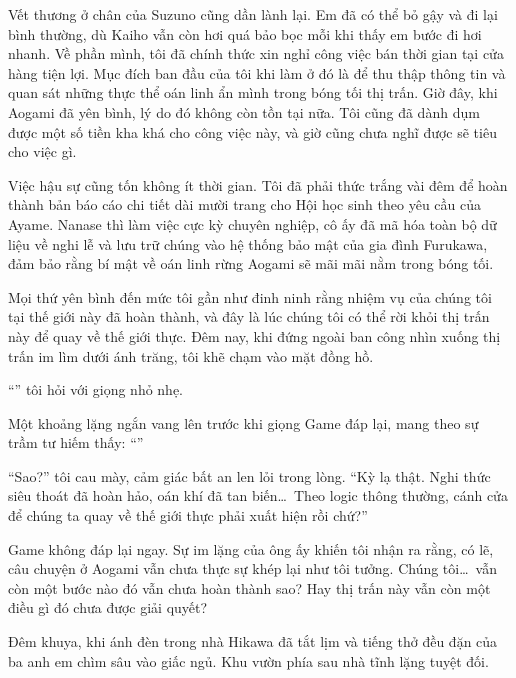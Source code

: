 \documentclass[../main.tex]{subfiles}
\begin{document}
Vết thương ở chân của Suzuno cũng dần lành lại. Em đã có thể bỏ gậy và đi lại bình thường, dù Kaiho vẫn còn hơi quá bảo bọc mỗi khi thấy em bước đi hơi nhanh. Về phần mình, tôi đã chính thức xin nghỉ công việc bán thời gian tại cửa hàng tiện lợi. Mục đích ban đầu của tôi khi làm ở đó là để thu thập thông tin và quan sát những thực thể oán linh ẩn mình trong bóng tối thị trấn. Giờ đây, khi Aogami đã yên bình, lý do đó không còn tồn tại nữa. Tôi cũng đã dành dụm được một số tiền kha khá cho công việc này, và giờ cũng chưa nghĩ được sẽ tiêu cho việc gì.

Việc hậu sự cũng tốn không ít thời gian. Tôi đã phải thức trắng vài đêm để hoàn thành bản báo cáo chi tiết dài mười trang cho Hội học sinh theo yêu cầu của Ayame. Nanase thì làm việc cực kỳ chuyên nghiệp, cô ấy đã mã hóa toàn bộ dữ liệu về nghi lễ và lưu trữ chúng vào hệ thống bảo mật của gia đình Furukawa, đảm bảo rằng bí mật về oán linh rừng Aogami sẽ mãi mãi nằm trong bóng tối.

Mọi thứ yên bình đến mức tôi gần như đinh ninh rằng nhiệm vụ của chúng tôi tại thế giới này đã hoàn thành, và đây là lúc chúng tôi có thể rời khỏi thị trấn này để quay về thế giới thực. Đêm nay, khi đứng ngoài ban công nhìn xuống thị trấn im lìm dưới ánh trăng, tôi khẽ chạm vào mặt đồng hồ.

``'' tôi hỏi với giọng nhỏ nhẹ.

Một khoảng lặng ngắn vang lên trước khi giọng Game đáp lại, mang theo sự trầm tư hiếm thấy: ``''

``Sao?'' tôi cau mày, cảm giác bất an len lỏi trong lòng. ``Kỳ lạ thật. Nghi thức siêu thoát đã hoàn hảo, oán khí đã tan biến\dots\ Theo logic thông thường, cánh cửa để chúng ta quay về thế giới thực phải xuất hiện rồi chứ?''

Game không đáp lại ngay. Sự im lặng của ông ấy khiến tôi nhận ra rằng, có lẽ, câu chuyện ở Aogami vẫn chưa thực sự khép lại như tôi tưởng. Chúng tôi\dots\ vẫn còn một bước nào đó vẫn chưa hoàn thành sao? Hay thị trấn này vẫn còn một điều gì đó chưa được giải quyết?

\pov{-}

Đêm khuya, khi ánh đèn trong nhà Hikawa đã tắt lịm và tiếng thở đều đặn của ba anh em chìm sâu vào giấc ngủ. Khu vườn phía sau nhà tĩnh lặng tuyệt đối.
\end{document}
